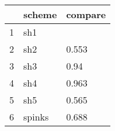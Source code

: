 \begin{table}[ht]
\centering
\begin{tabular}{rll}
  \hline
 & scheme & compare \\ 
  \hline
1 & sh1 &  \\ 
  2 & sh2 & 0.553 \\ 
  3 & sh3 & 0.94 \\ 
  4 & sh4 & 0.963 \\ 
  5 & sh5 & 0.565 \\ 
  6 & spinks & 0.688 \\ 
   \hline
\end{tabular}
\label{mmdif}
\end{table}
